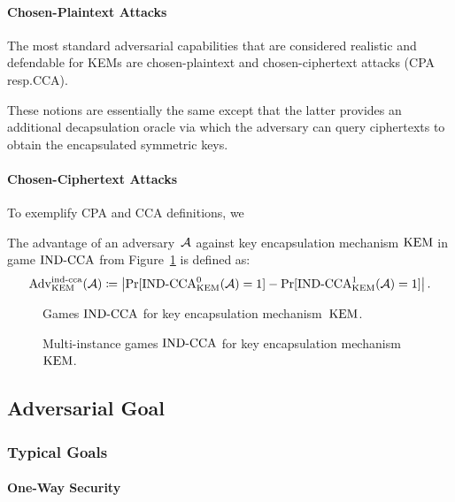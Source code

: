 \documentclass[a4paper,orivec]{llncs}
\begin{document}
\paragraph{Chosen-Plaintext Attacks}
The most standard adversarial capabilities that are considered realistic and defendable for KEMs are chosen-plaintext and chosen-ciphertext attacks (CPA resp.\@ CCA).


These notions are essentially the same except that the latter provides an additional decapsulation oracle via which the adversary can query ciphertexts to obtain the encapsulated symmetric keys.



\paragraph{Chosen-Ciphertext Attacks}
To exemplify CPA and CCA definitions, we 

The advantage of an adversary~$\mathcal{A}$ against key encapsulation mechanism $\mathrm{KEM}$ in game ${\mathrm{IND}\text{-}\mathrm{CCA}}$ from Figure~\ref{fig:kem:ind} is defined as:
\[
\mathrm{Adv}_{\mathrm{KEM}}^{\mathrm{ind}\text{-}\mathrm{cca}}(\mathcal{A})\coloneqq\left|\Pr[{\mathrm{IND}\text{-}\mathrm{CCA}}_{\mathrm{KEM}}^0(\mathcal{A})=1]-\Pr[{\mathrm{IND}\text{-}\mathrm{CCA}}_{\mathrm{KEM}}^1(\mathcal{A})=1]\right|\text{.}
\]

\begin{figure}[!ht]
    \centering
    \nicoresetlinenr%
    \fbox{%
        \scalebox{\codescalefactor}{%
        }%
    }
    \caption{%
        Games ${\mathrm{IND}\text{-}\mathrm{CCA}}$ for key encapsulation mechanism~$\mathrm{KEM}$.
    }
    \label{fig:kem:ind}
\end{figure}

\begin{figure}[!ht]
    \centering
    \nicoresetlinenr%
    \fbox{%
        \scalebox{\codescalefactor}{%
        }%
    }
    \caption{%
        Multi-instance games ${\mathrm{IND}\text{-}\mathrm{CCA}}$ for key encapsulation mechanism~$\mathrm{KEM}$.
    }
    \label{fig:kem:ind:mi:corrupt}
\end{figure}

\subsection{Adversarial Goal}

\subsubsection{Typical Goals}

\paragraph{One-Way Security}
\end{document}
